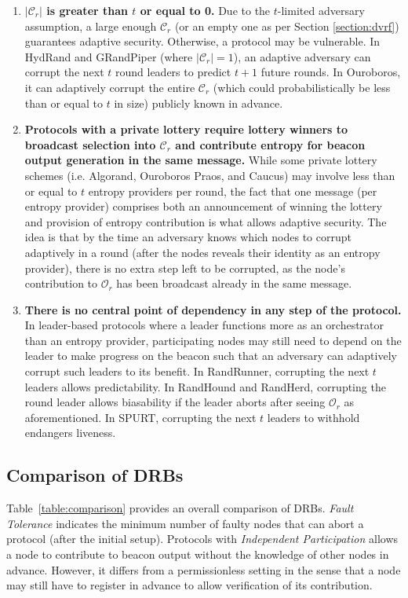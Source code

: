 \documentclass[conference]{IEEEtran}
\theoremstyle{definition}
\theoremstyle{remark}
\begin{document}
\begin{enumerate}
\item \textbf{$|\mathcal{C}_r|$ is greater than $t$ or equal to 0.} Due to the $t$-limited adversary assumption, a large enough $\mathcal{C}_r$ (or an empty one as per Section \ref{section:dvrf}) guarantees adaptive security. Otherwise, a protocol may be vulnerable. In HydRand and GRandPiper (where $|\mathcal{C}_r| = 1$), an adaptive adversary can corrupt the next $t$ round leaders to predict $t + 1$ future rounds. In Ouroboros, it can adaptively corrupt the entire $\mathcal{C}_r$ (which could probabilistically be less than or equal to $t$ in size) publicly known in advance.
\item \textbf{Protocols with a private lottery require lottery winners to broadcast selection into $\mathcal{C}_r$ and contribute entropy for beacon output generation in the same message.} While some private lottery schemes (i.e. Algorand, Ouroboros Praos, and Caucus) may involve less than or equal to $t$ entropy providers per round, the fact that one message (per entropy provider) comprises both an announcement of winning the lottery and provision of entropy contribution is what allows adaptive security. The idea is that by the time an adversary knows which nodes to corrupt adaptively in a round (after the nodes reveals their identity as an entropy provider), there is no extra step left to be corrupted, as the node's contribution to $\mathcal{O}_r$ has been broadcast already in the same message.
\item \textbf{There is no central point of dependency in any step of the protocol.} In leader-based protocols where a leader functions more as an orchestrator than an entropy provider, participating nodes may still need to depend on the leader to make progress on the beacon such that an adversary can adaptively corrupt such leaders to its benefit. In RandRunner, corrupting the next $t$ leaders allows predictability. In RandHound and RandHerd, corrupting the round leader allows biasability if the leader aborts after seeing $\mathcal{O}_r$ as aforementioned. In SPURT, corrupting the next $t$ leaders to withhold endangers liveness.
\end{enumerate}

\subsection{Comparison of DRBs}
Table~\ref{table:comparison} provides an overall comparison of DRBs. \textit{Fault Tolerance} indicates the minimum number of faulty nodes that can abort a protocol (after the initial setup). Protocols with \textit{Independent Participation} allows a node to contribute to beacon output without the knowledge of other nodes in advance. However, it differs from a permissionless setting in the sense that a node may still have to register in advance to allow verification of its contribution.
\end{document}
